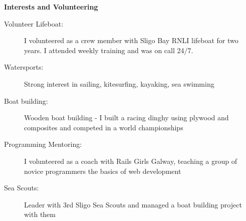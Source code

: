\documentclass[letterpaper,11pt]{article}
\newcommand{\resheading}[1]{{\large \colorbox{mygrey}{\begin{minipage}{\textwidth}{\textbf{#1 \vphantom{p\^{E}}}}\end{minipage}}}}
\begin{document}
\resheading{Interests and Volunteering}
	\begin{description}
		\item[Volunteer Lifeboat:] I volunteered as a crew member with Sligo Bay RNLI lifeboat for two years. I attended weekly training and was on call 24/7.
		\item[Watersports:] Strong interest in sailing, kitesurfing, kayaking, sea swimming
		\item[Boat building:] Wooden boat building - I built a racing dinghy using plywood and composites and competed in a world championships
		\item[Programming Mentoring:] I volunteered as a coach with Rails Girls Galway, teaching a group of novice programmers the basics of web development
		\item[Sea Scouts:] Leader with 3rd Sligo Sea Scouts and managed a boat building project with them

	\end{description} %
\end{document}
